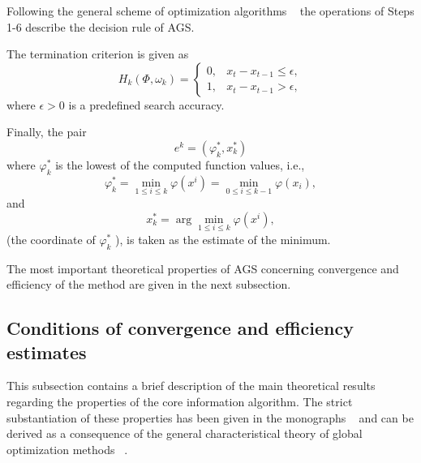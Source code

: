 Following the general scheme of optimization algorithms ~\cite{2_GriSergChap1}  the operations of Steps 1-6 describe the decision rule of AGS.

The termination criterion is given as
\begin{equation}
\label{eq:2_21}
H_k(\Phi,\omega_k) =
  \begin{cases}
    0, & x_t-x_{t-1}\leq\epsilon, \\
    1, & x_t-x_{t-1}>\epsilon,
  \end{cases}
\end{equation}
where $\epsilon>0$  is a predefined search accuracy.

Finally, the pair
\begin{equation}
\label{eq:2_21_1}
e^k=(\varphi_k^*,x_k^*)
\end{equation}
where  $\varphi_k^*$ is the lowest of the computed function values, i.e.,
\begin{equation}
\label{eq:2_21_2}
\varphi_k^*=\min_{1\leq i\leq k}\varphi(x^i)=\min_{0\leq i\leq {k-1}}\varphi(x_i),
\end{equation}
and
\begin{displaymath}
x_k^*=\arg \min_{1\leq i\leq k}\varphi(x^i),
\end{displaymath}
(the coordinate of $\varphi_k^*$ ), is taken as the estimate of the minimum. 

The most important theoretical properties of AGS concerning convergence and efficiency of the method are given in the next subsection. 
\subsection {Conditions of convergence and efficiency estimates}
\label{subsec:2_2_2}
This subsection contains a brief description of the main theoretical results regarding the properties of the core information algorithm. The strict substantiation of these properties has been given in the monographs ~\cite{2_StrMonRus, 2_StrSergMon2000} and can be derived as a consequence of the general characteristical theory of global optimization methods ~\cite{2_GrishaginSergeyevStrongin}.

